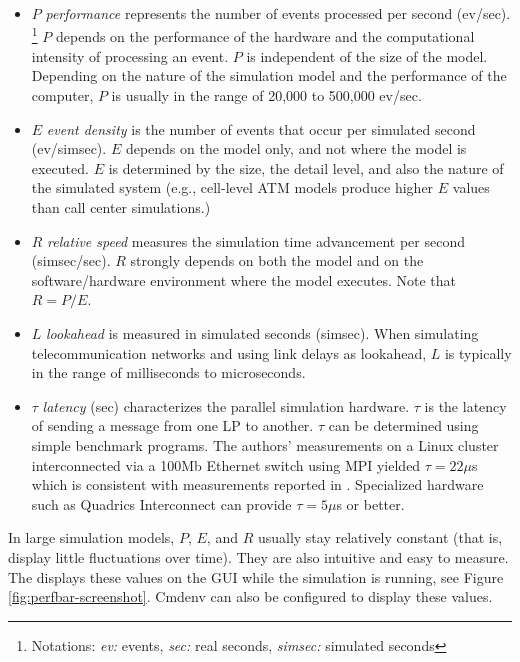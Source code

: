 \begin{itemize}
  \item{$P$ \textit{performance} represents the number of events processed per
    second (ev/sec).
       \footnote{Notations: \textit{ev:} events, \textit{sec:} real seconds,
       \textit{simsec:} simulated seconds}
    $P$ depends on the performance of the hardware and the computational intensity
    of processing an event. $P$ is independent of the size of the model.
    Depending on the nature of the simulation model and the performance of the
    computer, $P$ is usually in the range of 20,000 to 500,000 ev/sec.}
  \item{$E$ \textit{event density} is the number of events that occur per
    simulated second (ev/simsec). $E$ depends on the model only, and not
    where the model is executed. $E$ is determined by the size, the detail level,
    and also the nature of the simulated system (e.g., cell-level ATM models
    produce higher $E$ values than call center simulations.)}
  \item{$R$ \textit{relative speed} measures the simulation time advancement
    per second (simsec/sec). $R$ strongly depends on both the model and
    on the software/hardware environment where the model executes.
    Note that $R = P/E$.}
  \item{$L$ \textit{lookahead} is measured in simulated seconds (simsec).
    When simulating telecommunication networks and using link delays as
    lookahead, $L$ is typically in the range of milliseconds to microseconds.}
  \item{$\tau$ \textit{latency} (sec) characterizes the parallel simulation hardware.
    $\tau$ is the latency of sending a message from one LP to another. $\tau$
    can be determined using simple benchmark programs. The authors' measurements
    on a Linux cluster interconnected via a 100Mb Ethernet switch using MPI
    yielded $\tau = 22\mu$s which is consistent with measurements reported
    in \cite{ongfarrell2000}. Specialized hardware such as
    Quadrics Interconnect \cite{quadrics} can provide $\tau = 5\mu$s or better.}
\end{itemize}

In large simulation models, $P$, $E$, and $R$ usually stay relatively constant
(that is, display little fluctuations over time). They are also intuitive and
easy to measure. The {\opp} displays these values on the GUI while the simulation
is running, see Figure \ref{fig:perfbar-screenshot}. Cmdenv can also be configured
to display these values.


